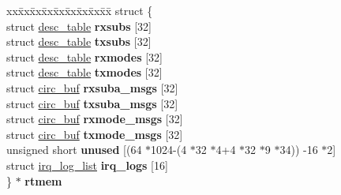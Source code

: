 \begin{DoxyCompactItemize}
\begin{tabbing}
\end{tabbing}\item 
\mbox{\label{structbrm__priv_a8b315c1977c619932a0ee4525984f621}} 
\begin{tabbing}
xx\=xx\=xx\=xx\=xx\=xx\=xx\=xx\=xx\=\kill
struct \{\\
\>struct \mbox{\hyperlink{structbrm__priv_1_1desc__table}{desc\_table}} {\bfseries rxsubs} \mbox{[}32\mbox{]}\\
\>struct \mbox{\hyperlink{structbrm__priv_1_1desc__table}{desc\_table}} {\bfseries txsubs} \mbox{[}32\mbox{]}\\
\>struct \mbox{\hyperlink{structbrm__priv_1_1desc__table}{desc\_table}} {\bfseries rxmodes} \mbox{[}32\mbox{]}\\
\>struct \mbox{\hyperlink{structbrm__priv_1_1desc__table}{desc\_table}} {\bfseries txmodes} \mbox{[}32\mbox{]}\\
\>struct \mbox{\hyperlink{structcirc__buf}{circ\_buf}} {\bfseries rxsuba\_msgs} \mbox{[}32\mbox{]}\\
\>struct \mbox{\hyperlink{structcirc__buf}{circ\_buf}} {\bfseries txsuba\_msgs} \mbox{[}32\mbox{]}\\
\>struct \mbox{\hyperlink{structcirc__buf}{circ\_buf}} {\bfseries rxmode\_msgs} \mbox{[}32\mbox{]}\\
\>struct \mbox{\hyperlink{structcirc__buf}{circ\_buf}} {\bfseries txmode\_msgs} \mbox{[}32\mbox{]}\\
\>unsigned short {\bfseries unused} \mbox{[}(64 $\ast$1024-\/(4 $\ast$32 $\ast$4+4 $\ast$32 $\ast$9 $\ast$34)) -\/16 $\ast$2\mbox{]}\\
\>struct \mbox{\hyperlink{structirq__log__list}{irq\_log\_list}} {\bfseries irq\_logs} \mbox{[}16\mbox{]}\\
\} $\ast$ {\bfseries rtmem}\\


\end{tabbing}
\end{DoxyCompactItemize}
